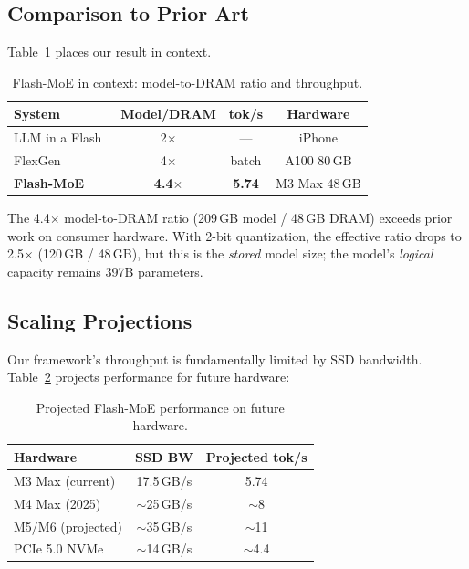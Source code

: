 \documentclass[11pt,twocolumn]{article}
\begin{document}
\subsection{Comparison to Prior Art}

Table~\ref{tab:comparison} places our result in context.

\begin{table}[t]
\centering
\small
\caption{Flash-MoE in context: model-to-DRAM ratio and throughput.}
\label{tab:comparison}
\begin{tabular}{@{}lccc@{}}
\toprule
\textbf{System} & \textbf{Model/DRAM} & \textbf{tok/s} & \textbf{Hardware} \\
\midrule
LLM in a Flash~\cite{alizadeh2023llm} & 2$\times$ & --- & iPhone \\
FlexGen~\cite{sheng2023flexgen} & 4$\times$ & batch & A100 80\,GB \\
\textbf{Flash-MoE} & \textbf{4.4$\times$} & \textbf{5.74} & M3 Max 48\,GB \\
\bottomrule
\end{tabular}
\end{table}

The 4.4$\times$ model-to-DRAM ratio (209\,GB model / 48\,GB DRAM) exceeds prior work on consumer hardware.
With 2-bit quantization, the effective ratio drops to 2.5$\times$ (120\,GB / 48\,GB), but this is the \emph{stored} model size; the model's \emph{logical} capacity remains 397B parameters.

\subsection{Scaling Projections}

Our framework's throughput is fundamentally limited by SSD bandwidth.
Table~\ref{tab:scaling} projects performance for future hardware:

\begin{table}[t]
\centering
\small
\caption{Projected Flash-MoE performance on future hardware.}
\label{tab:scaling}
\begin{tabular}{@{}lcc@{}}
\toprule
\textbf{Hardware} & \textbf{SSD BW} & \textbf{Projected tok/s} \\
\midrule
M3 Max (current) & 17.5\,GB/s & 5.74 \\
M4 Max (2025) & $\sim$25\,GB/s & $\sim$8 \\
M5/M6 (projected) & $\sim$35\,GB/s & $\sim$11 \\
PCIe 5.0 NVMe & $\sim$14\,GB/s & $\sim$4.4 \\
\bottomrule
\end{tabular}
\end{table}
\end{document}
